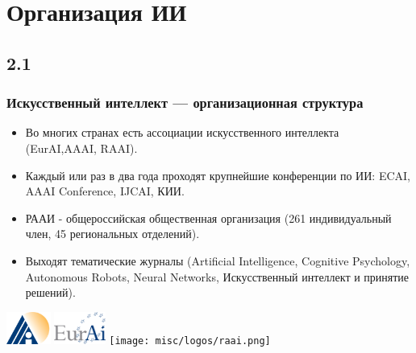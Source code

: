\documentclass[default]{beamer}
\begin{document}
	\section{Организация ИИ}
	\subsection{2.1}
	\begin{frame}
		\frametitle{Искусственный интеллект --- организационная структура}
		
		\begin{itemize}
			\item Во многих странах есть ассоциации искусственного интеллекта (EurAI,AAAI, RAAI).
			\item Каждый или раз в два года проходят крупнейшие конференции по ИИ: ECAI, AAAI Conference, IJCAI, КИИ.
			\item РААИ - общероссийская общественная организация (261 индивидуальный член, 45 региональных отделений).
			\item Выходят тематические журналы (Artificial Intelligence, Cognitive Psychology, Autonomous Robots, Neural Networks, Искусственный интеллект и принятие решений).
		\end{itemize}
		\par\bigskip
		\centering
		\includegraphics[height=30pt]{aaai.png} \hspace{10pt}
		\includegraphics[height=30pt]{eurai.png} \hspace{10pt}
		\texttt{[image: misc/logos/raai.png]} 
	\end{frame}
\end{document}
